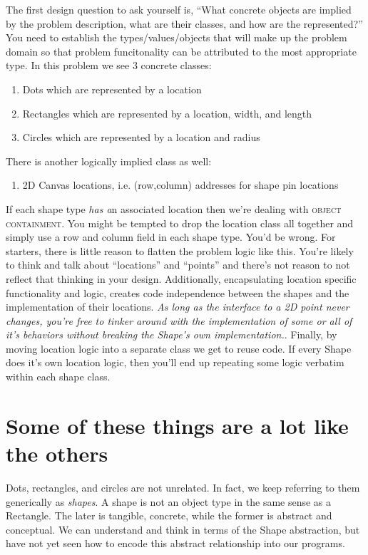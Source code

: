 \documentclass[]{tufte-handout}
\begin{document}
The first design question to ask yourself is, ``What concrete objects are implied by the problem description, what are their classes, and how are the represented?'' You need to establish the types/values/objects that will make up the problem domain so that problem funcitonality can be attributed to the most appropriate type. In this problem we see 3 concrete classes:
\begin{enumerate}
\item Dots which are represented by a location
\item Rectangles which are represented by a location, width, and length
\item Circles which are represented by a location and radius
\end{enumerate}
There is another logically implied class as well: 
\begin{enumerate}
\item 2D Canvas locations, i.e. (row,column) addresses for shape pin locations
\end{enumerate}

If each shape type \textit{has a}n associated location then we're dealing with \textsc{object containment}. You might be tempted to drop the location class all together and simply use a row and column field in each shape type. You'd be wrong. For starters, there is little reason to flatten the problem logic like this. You're likely to think and talk about ``locations'' and ``points'' and there's not reason to not reflect that thinking in your design. Additionally, encapsulating location specific functionality and logic, creates code independence between the shapes and the implementation of their locations. \textit{As long as the interface to a 2D point never changes, you're free to tinker around with the implementation of some or all of it's behaviors without breaking the Shape's own implementation.}. Finally, by moving location logic into a separate class we get to reuse code. If every Shape does it's own location logic, then you'll end up repeating some logic verbatim within each shape class. 

\section{Some of these things are a lot like the others}  

Dots, rectangles, and circles are not unrelated. In fact, we keep referring to them generically as \textit{shapes}.  A shape is not an object type in the same sense as a Rectangle. The later is tangible, concrete, while the former is abstract and conceptual. We can understand and think in terms of the Shape abstraction, but have not yet seen how to encode this abstract relationship into our programs. 
\end{document}
